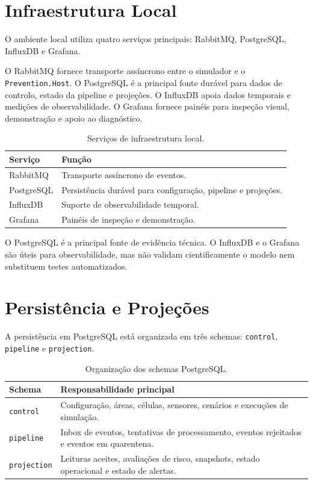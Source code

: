 \section{Infraestrutura Local}

O ambiente local utiliza quatro serviços principais: RabbitMQ, PostgreSQL, InfluxDB e Grafana.

O RabbitMQ fornece transporte assíncrono entre o simulador e o \texttt{Prevention.Host}. O PostgreSQL é a principal fonte durável para dados de controlo, estado da pipeline e projeções. O InfluxDB apoia dados temporais e medições de observabilidade. O Grafana fornece painéis para inspeção visual, demonstração e apoio ao diagnóstico.

\begin{table}[h]
\centering
\caption{Serviços de infraestrutura local.}
\label{tab:local-infrastructure}
\begin{tabular}{p{} p{}}
\hline
\textbf{Serviço} & \textbf{Função} \\
\hline
RabbitMQ & Transporte assíncrono de eventos. \\
PostgreSQL & Persistência durável para configuração, pipeline e projeções. \\
InfluxDB & Suporte de observabilidade temporal. \\
Grafana & Painéis de inspeção e demonstração. \\
\hline
\end{tabular}
\end{table}

O PostgreSQL é a principal fonte de evidência técnica. O InfluxDB e o Grafana são úteis para observabilidade, mas não validam cientificamente o modelo nem substituem testes automatizados.

\section{Persistência e Projeções}

A persistência em PostgreSQL está organizada em três schemas: \texttt{control}, \texttt{pipeline} e \texttt{projection}.

\begin{table}[h]
\centering
\caption{Organização dos schemas PostgreSQL.}
\label{tab:postgres-architecture}
\begin{tabular}{p{} p{}}
\hline
\textbf{Schema} & \textbf{Responsabilidade principal} \\
\hline
\texttt{control} & Configuração, áreas, células, sensores, cenários e execuções de simulação. \\
\texttt{pipeline} & Inbox de eventos, tentativas de processamento, eventos rejeitados e eventos em quarentena. \\
\texttt{projection} & Leituras aceites, avaliações de risco, snapshots, estado operacional e estado de alertas. \\
\hline
\end{tabular}
\end{table}

